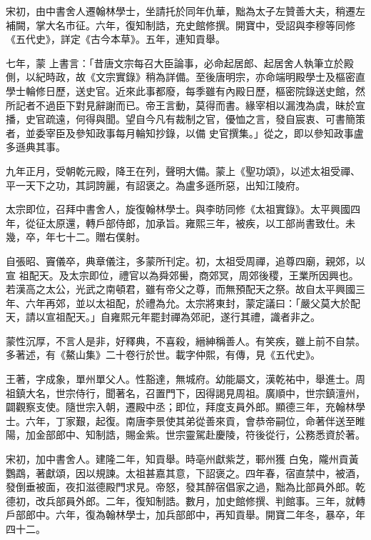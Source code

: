 \begin{pinyinscope}
 宋初，由中書舍人遷翰林學士，坐請托於同年仇華，黜為太子左贊善大夫，稍遷左補闕，掌大名市征。六年，復知制誥，充史館修撰。開寶中，受詔與李穆等同修《五代史》，詳定《古今本草》。五年，連知貢舉。



 七年，蒙
 上書言：「昔唐文宗每召大臣論事，必命起居郎、起居舍人執筆立於殿側，以紀時政，故《文宗實錄》稍為詳備。至後唐明宗，亦命端明殿學士及樞密直學士輪修日歷，送史官。近來此事都廢，每季雖有內殿日歷，樞密院錄送史館，然所記者不過臣下對見辭謝而已。帝王言動，莫得而書。緣宰相以漏洩為虞，昧於宣播，史官疏遠，何得與聞。望自今凡有裁制之官，優恤之言，發自宸衷、可書簡策者，並委宰臣及參知政事每月輪知抄錄，以備
 史官撰集。」從之，即以參知政事盧多遜典其事。



 九年正月，受朝乾元殿，降王在列，聲明大備。蒙上《聖功頌》，以述太祖受禪、平一天下之功，其詞誇麗，有詔褒之。為盧多遜所惡，出知江陵府。



 太宗即位，召拜中書舍人，旋復翰林學士。與李昉同修《太祖實錄》。太平興國四年，從征太原還，轉戶部侍郎，加承旨。雍熙三年，被疾，以工部尚書致仕。未幾，卒，年七十二。贈右僕射。



 自張昭、竇儀卒，典章儀注，多蒙所刊定。初，太祖受周禪，追尊四廟，親郊，以宣
 祖配天。及太宗即位，禮官以為舜郊嚳，商郊冥，周郊後稷，王業所因興也。若漢高之太公，光武之南頓君，雖有帝父之尊，而無預配天之祭。故自太平興國三年、六年再郊，並以太祖配，於禮為允。太宗將東封，蒙定議曰：「嚴父莫大於配天，請以宣祖配天。」自雍熙元年罷封禪為郊祀，遂行其禮，識者非之。



 蒙性沉厚，不言人是非，好釋典，不喜殺，縉紳稱善人。有笑疾，雖上前不自禁。多著述，有《鰲山集》二十卷行於世。載字仲熙，有傳，見《五代史》。



 王著，字成象，單州單父人。性豁達，無城府。幼能屬文，漢乾祐中，舉進士。周祖鎮大名，世宗侍行，聞著名，召置門下，因得謁見周祖。廣順中，世宗鎮澶州，闢觀察支使。隨世宗入朝，遷殿中丞；即位，拜度支員外郎。顯德三年，充翰林學士。六年，丁家艱，起復。南唐李景使其弟從善來貢，會恭帝嗣位，命著伴送至睢陽，加金部郎中、知制誥，賜金紫。世宗靈駕赴慶陵，符後從行，公務悉資於著。



 宋初，加中書舍人。建隆二年，知貢舉。時亳州獻紫芝，鄆州獲
 白兔，隴州貢黃鸚鵡，著獻頌，因以規諫。太祖甚嘉其意，下詔褒之。四年春，宿直禁中，被酒，發倒垂被面，夜扣滋德殿門求見。帝怒，發其醉宿倡家之過，黜為比部員外郎。乾德初，改兵部員外郎。二年，復知制誥。數月，加史館修撰、判館事。三年，就轉戶部郎中。六年，復為翰林學士，加兵部郎中，再知貢舉。開寶二年冬，暴卒，年四十二。




\end{pinyinscope}

